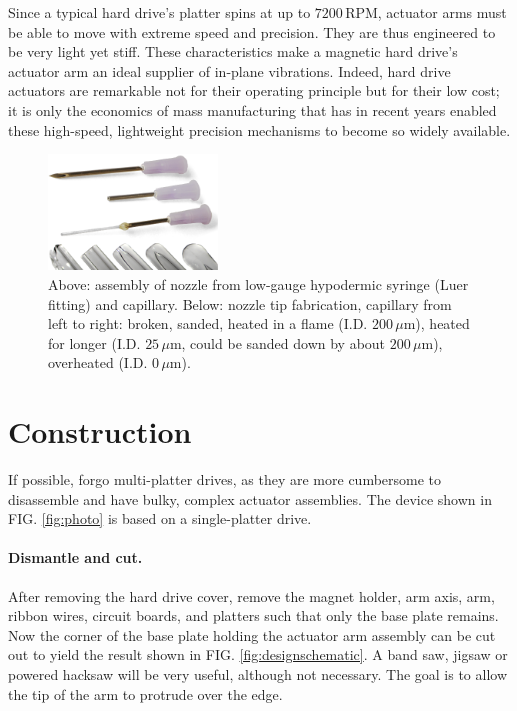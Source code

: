 \documentclass[aip,rsi,reprint,graphicx]{revtex4-1} %
\begin{document}
Since a typical hard drive's platter spins at up to $7200\,$RPM,
actuator arms must be able to move with extreme speed and precision. They are
thus engineered to be very light yet stiff. These characteristics make a
magnetic hard drive's actuator arm an ideal supplier of in-plane vibrations.
Indeed, hard drive actuators are remarkable not for their operating principle
but for their low cost; it is only the economics of mass manufacturing that has
in recent years enabled these high-speed, lightweight precision mechanisms to
become so widely available.

\begin{figure}
\centering
\includegraphics[width=0.4\textwidth]{hdg_images/needlescombo.eps}
\caption{Above: assembly of nozzle from
low-gauge hypodermic syringe (Luer fitting) and capillary. Below: nozzle tip
fabrication, capillary from left to right: broken, sanded, heated in a flame (I.D.
$200\,\mu$m), heated for longer (I.D. $25\,\mu$m, could be sanded down by about
$200\,\mu$m), overheated (I.D. $0\,\mu$m). \label{fig:needles}}
\end{figure}


\section{Construction}
If possible, forgo multi-platter drives, as they are more cumbersome to disassemble and have
bulky, complex actuator assemblies. The device shown in FIG. \ref{fig:photo}
is based on a single-platter drive.

\paragraph{Dismantle and cut.} After removing the hard drive cover, remove
the magnet holder, arm axis, arm, ribbon wires, circuit boards, and platters
such that only the base plate remains. Now the corner of the base plate holding
the actuator arm assembly can be cut out to yield the result shown in FIG.
\ref{fig:designschematic}. A band saw, jigsaw or powered hacksaw will be very
useful, although not necessary. The goal is to allow the tip of the arm to
protrude over the edge.
\end{document}
